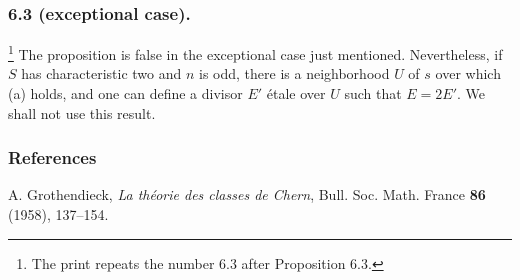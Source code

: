 \subsubsection*{6.3 (exceptional case).}
\footnote{The print repeats the number 6.3 after Proposition 6.3.}
The proposition is false in the exceptional case just mentioned.
Nevertheless, if $S$ has characteristic two and $n$ is odd, there is
a neighborhood $U$ of $s$ over which (a) holds, and one can define a
divisor $E'$ étale over $U$ such that $E=2E'$.  We shall not use this
result.

\subsubsection*{References}

\noindent[1] A. Grothendieck, \emph{La théorie des classes de Chern},
Bull. Soc. Math. France \textbf{86} (1958), 137--154.

